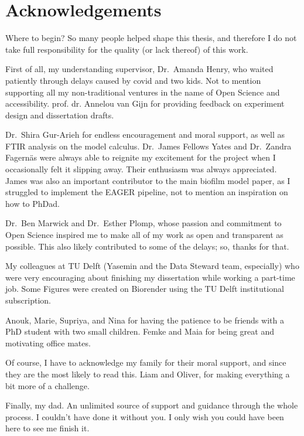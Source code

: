 \documentclass[
  b5paper,
]{book}
\begin{document}
\label{acknowledgements}

\chapter*{Acknowledgements}


Where to begin? So many people helped shape this thesis, and therefore I
do not take full responsibility for the quality (or lack thereof) of
this work.

First of all, my understanding supervisor, Dr.~Amanda Henry, who waited
patiently through delays caused by covid and two kids. Not to mention
supporting all my non-traditional ventures in the name of Open Science
and accessibility. prof. dr. Annelou van Gijn for providing feedback on
experiment design and dissertation drafts.

Dr.~Shira Gur-Arieh for endless encouragement and moral support, as well
as FTIR analysis on the model calculus. Dr.~James Fellows Yates and
Dr.~Zandra Fagernäs were always able to reignite my excitement for the
project when I occasionally felt it slipping away. Their enthusiasm was
always appreciated. James was also an important contributor to the main
biofilm model paper, as I struggled to implement the EAGER pipeline, not
to mention an inspiration on how to PhDad.

Dr.~Ben Marwick and Dr.~Esther Plomp, whose passion and commitment to
Open Science inspired me to make all of my work as open and transparent
as possible. This also likely contributed to some of the delays; so,
thanks for that.

My colleagues at TU Delft (Yasemin and the Data Steward team,
especially) who were very encouraging about finishing my dissertation
while working a part-time job. Some Figures were created on Biorender
using the TU Delft institutional subscription.

Anouk, Marie, Supriya, and Nina for having the patience to be friends
with a PhD student with two small children. Femke and Maia for being
great and motivating office mates.

Of course, I have to acknowledge my family for their moral support, and
since they are the most likely to read this. Liam and Oliver, for making
everything a bit more of a challenge.

Finally, my dad. An unlimited source of support and guidance through the
whole process. I couldn't have done it without you. I only wish you
could have been here to see me finish it.
\end{document}
